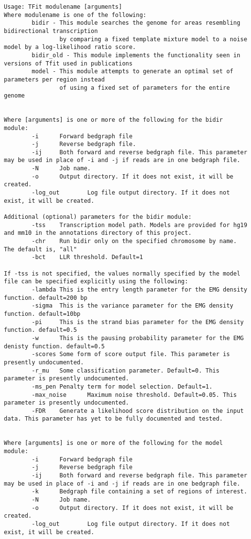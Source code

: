 \begin{lstlisting}
Usage: TFit modulename [arguments]
Where modulename is one of the following:
        bidir - This module searches the genome for areas resembling bidirectional transcription
                by comparing a fixed template mixture model to a noise model by a log-likelihood ratio score.
        bidir_old - This module implements the functionality seen in versions of Tfit used in publications
        model - This module attempts to generate an optimal set of parameters per region instead 
                of using a fixed set of parameters for the entire genome


Where [arguments] is one or more of the following for the bidir module:
        -i      Forward bedgraph file
        -j      Reverse bedgraph file.
        -ij     Both forward and reverse bedgraph file. This parameter may be used in place of -i and -j if reads are in one bedgraph file.
        -N      Job name.
        -o      Output directory. If it does not exist, it will be created.
        -log_out        Log file output directory. If it does not exist, it will be created.

Additional (optional) parameters for the bidir module:
        -tss    Transcription model path. Models are provided for hg19 and mm10 in the annotations directory of this project.
        -chr    Run bidir only on the specified chromosome by name. The default is, "all"
        -bct    LLR threshold. Default=1

If -tss is not specified, the values normally specified by the model file can be specified explicitly using the following:
        -lambda This is the entry length parameter for the EMG density function. default=200 bp
        -sigma  This is the variance parameter for the EMG density function. default=10bp
        -pi     This is the strand bias parameter for the EMG density function. default=0.5
        -w      This is the pausing probability parameter for the EMG denisty function. default=0.5
        -scores Some form of score output file. This parameter is presently undocumented.
        -r_mu   Some classification parameter. Default=0. This parameter is presently undocumented.
        -ms_pen Penalty term for model selection. Default=1.
        -max_noise      Maximum noise threshold. Default=0.05. This parameter is presently undocumented.
        -FDR    Generate a likelihood score distribution on the input data. This parameter has yet to be fully documented and tested.


Where [arguments] is one or more of the following for the model module:
        -i      Forward bedgraph file
        -j      Reverse bedgraph file
        -ij     Both forward and reverse bedgraph file. This parameter may be used in place of -i and -j if reads are in one bedgraph file.
        -k      Bedgraph file containing a set of regions of interest.
        -N      Job name.
        -o      Output directory. If it does not exist, it will be created.
        -log_out        Log file output directory. If it does not exist, it will be created.


\end{lstlisting}
